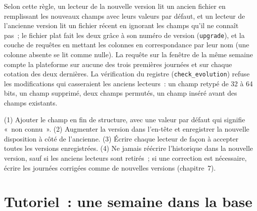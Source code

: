 Selon cette règle, un lecteur de la nouvelle version lit un ancien fichier en remplissant les nouveaux champs avec leurs valeurs par défaut, et un lecteur de l'ancienne
version lit un fichier récent en ignorant les champs qu'il ne connaît pas~; le fichier plat fait les deux grâce à son numéro de version
(\texttt{upgrade}), et la couche de requêtes en mettant les colonnes en correspondance par leur nom (une colonne absente se lit comme nulle). La requête sur la fenêtre
de la même semaine compte la plateforme sur aucune des trois premières journées et sur chaque cotation des deux dernières. La vérification du registre
(\texttt{check\_evolution}) refuse les modifications qui casseraient les anciens lecteurs~: un champ retypé de 32 à 64 bits, un champ
supprimé, deux champs permutés, un champ inséré avant des champs existants.

\begin{method}\label{met:pl:a-tick-store-on-open-formats:evolve}
(1) Ajouter le champ en fin de structure, avec une valeur par défaut qui signifie «~non connu~». (2) Augmenter la version dans l'en-tête et enregistrer la nouvelle
disposition à côté de l'ancienne. (3) Écrire chaque lecteur de façon à accepter toutes les versions enregistrées. (4) Ne jamais réécrire l'historique dans la nouvelle
version, sauf si les anciens lecteurs sont retirés~; si une correction est nécessaire, écrire les journées corrigées comme de nouvelles versions (chapitre~7).
\end{method}

\section{Tutoriel~: une semaine dans la base}\label{tut:pl:a-tick-store-on-open-formats:tut}


